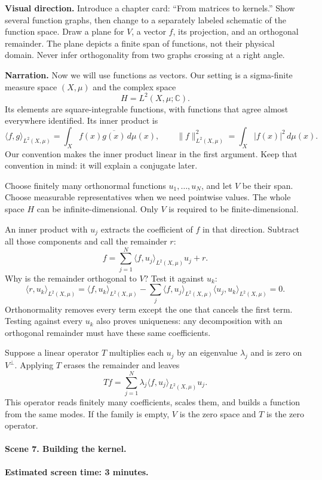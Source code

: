 \textbf{Visual direction.} Introduce a chapter card: ``From matrices to kernels.'' Show several function graphs, then change to a separately labeled schematic of the function space. Draw a plane for $V$, a vector $f$, its projection, and an orthogonal remainder. The plane depicts a finite span of functions, not their physical domain. Never infer orthogonality from two graphs crossing at a right angle.

\textbf{Narration.} Now we will use functions as vectors. Our setting is a sigma-finite measure space $(X,\mu)$ and the complex space
\[
H=L^2(X,\mu;\mathbb C).
\]
Its elements are square-integrable functions, with functions that agree almost everywhere identified. Its inner product is
\[
\langle f,g\rangle_{L^2(X,\mu)}
=\int_X f(x)\overline{g(x)}\,d\mu(x),
\qquad
\|f\|_{L^2(X,\mu)}^2=\int_X|f(x)|^2\,d\mu(x).
\]
Our convention makes the inner product linear in the first argument. Keep that convention in mind: it will explain a conjugate later.

Choose finitely many orthonormal functions $u_1,\ldots,u_N$, and let $V$ be their span. Choose measurable representatives when we need pointwise values. The whole space $H$ can be infinite-dimensional. Only $V$ is required to be finite-dimensional.

An inner product with $u_j$ extracts the coefficient of $f$ in that direction. Subtract all those components and call the remainder $r$:
\[
f=\sum_{j=1}^N\langle f,u_j\rangle_{L^2(X,\mu)}u_j+r.
\]
Why is the remainder orthogonal to $V$? Test it against $u_k$:
\[
\langle r,u_k\rangle_{L^2(X,\mu)}
=\langle f,u_k\rangle_{L^2(X,\mu)}
-\sum_j\langle f,u_j\rangle_{L^2(X,\mu)}
\langle u_j,u_k\rangle_{L^2(X,\mu)}=0.
\]
Orthonormality removes every term except the one that cancels the first term. Testing against every $u_k$ also proves uniqueness: any decomposition with an orthogonal remainder must have these same coefficients.

Suppose a linear operator $T$ multiplies each $u_j$ by an eigenvalue $\lambda_j$ and is zero on $V^\perp$. Applying $T$ erases the remainder and leaves
\[
Tf=\sum_{j=1}^N\lambda_j\langle f,u_j\rangle_{L^2(X,\mu)}u_j.
\]
This operator reads finitely many coefficients, scales them, and builds a function from the same modes. If the family is empty, $V$ is the zero space and $T$ is the zero operator.

\paragraph{Scene 7. Building the kernel.}
\textbf{Estimated screen time: 3 minutes.}

